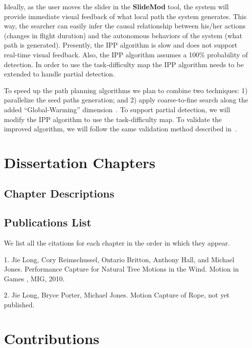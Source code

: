Ideally, as the user moves the slider in the \textbf{SlideMod} tool, the system will provide immediate visual feedback of what local path the system generates. This way, the searcher can easily infer the causal relationship between his/her actions (changes in flight duration) and the autonomous behaviors of the system (what path is generated). Presently, the IPP algorithm is slow and does not support real-time visual feedback. Also, the IPP algorithm assumes a 100\% probability of detection. In order to use the task-difficulty map the IPP algorithm needs to be extended to handle partial detection.

To speed up the path planning algorithms we plan to combine two techniques: 1) parallelize the seed paths generation; and 2) apply coarse-to-fine search along the added ``Global-Warming'' dimension~\cite{Lin2009UAV}. To support partial detection, we will modify the IPP algorithm to use the task-difficulty map. To validate the improved algorithm, we will follow the same validation method described in~\cite{Lin2009UAV}.


\section{Dissertation Chapters}

\subsection{Chapter Descriptions}

\subsection{Publications List}

We list all the citations for each chapter in the order in which they appear.

1. Jie Long, Cory Reimschussel, Ontario Britton, Anthony Hall, and Michael Jones. Performance Capture for Natural Tree Motions in the Wind. Motion in Games , MIG, 2010. 

2. Jie Long, Bryce Porter, Michael Jones. Motion Capture of Rope, not yet published.


\section{Contributions}


